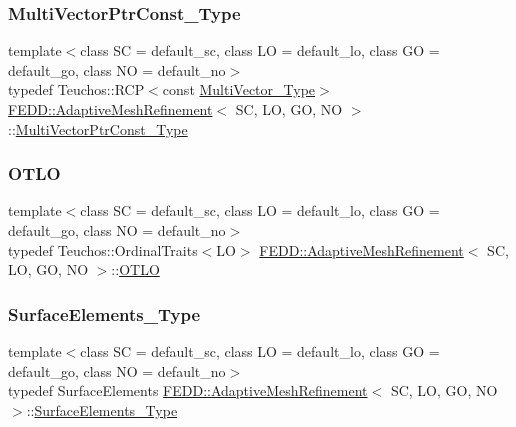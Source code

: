 \subsubsection{\texorpdfstring{Multi\+Vector\+Ptr\+Const\+\_\+\+Type}{MultiVectorPtrConst\_Type}}
{\footnotesize\ttfamily template$<$class SC  = default\+\_\+sc, class LO  = default\+\_\+lo, class GO  = default\+\_\+go, class NO  = default\+\_\+no$>$ \\
typedef Teuchos\+::\+R\+CP$<$const \hyperlink{classFEDD_1_1AdaptiveMeshRefinement_afba165f2caa97c6de40654b1ee51e38d}{Multi\+Vector\+\_\+\+Type}$>$ \hyperlink{classFEDD_1_1AdaptiveMeshRefinement}{F\+E\+D\+D\+::\+Adaptive\+Mesh\+Refinement}$<$ SC, LO, GO, NO $>$\+::\hyperlink{classFEDD_1_1AdaptiveMeshRefinement_a5af7c0982afd7187a77c802477675cc6}{Multi\+Vector\+Ptr\+Const\+\_\+\+Type}}

\mbox{\label{classFEDD_1_1AdaptiveMeshRefinement_a5926fc86d008bfd69ae52e9190197eb0}} 
\subsubsection{\texorpdfstring{O\+T\+LO}{OTLO}}
{\footnotesize\ttfamily template$<$class SC  = default\+\_\+sc, class LO  = default\+\_\+lo, class GO  = default\+\_\+go, class NO  = default\+\_\+no$>$ \\
typedef Teuchos\+::\+Ordinal\+Traits$<$LO$>$ \hyperlink{classFEDD_1_1AdaptiveMeshRefinement}{F\+E\+D\+D\+::\+Adaptive\+Mesh\+Refinement}$<$ SC, LO, GO, NO $>$\+::\hyperlink{classFEDD_1_1AdaptiveMeshRefinement_a5926fc86d008bfd69ae52e9190197eb0}{O\+T\+LO}}

\mbox{\label{classFEDD_1_1AdaptiveMeshRefinement_afa6eaf74293132701460f9107ce0c070}} 
\subsubsection{\texorpdfstring{Surface\+Elements\+\_\+\+Type}{SurfaceElements\_Type}}
{\footnotesize\ttfamily template$<$class SC  = default\+\_\+sc, class LO  = default\+\_\+lo, class GO  = default\+\_\+go, class NO  = default\+\_\+no$>$ \\
typedef Surface\+Elements \hyperlink{classFEDD_1_1AdaptiveMeshRefinement}{F\+E\+D\+D\+::\+Adaptive\+Mesh\+Refinement}$<$ SC, LO, GO, NO $>$\+::\hyperlink{classFEDD_1_1AdaptiveMeshRefinement_afa6eaf74293132701460f9107ce0c070}{Surface\+Elements\+\_\+\+Type}}

